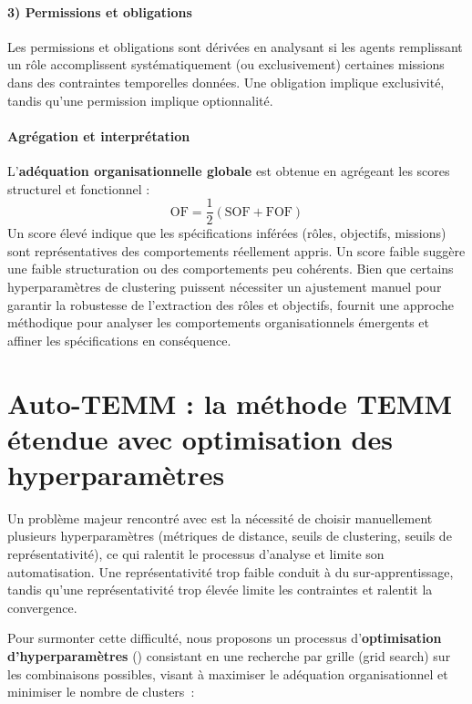 \paragraph{3) Permissions et obligations}
Les permissions et obligations sont dérivées en analysant si les agents remplissant un rôle accomplissent systématiquement (ou exclusivement) certaines missions dans des contraintes temporelles données.
Une obligation implique exclusivité, tandis qu’une permission implique optionnalité.

\paragraph{Agrégation et interprétation}
L’\textbf{adéquation organisationnelle globale} est obtenue en agrégeant les scores structurel et fonctionnel :
\[
  \text{OF} = \frac{1}{2} \left( \text{SOF} + \text{FOF} \right)
\]
Un score élevé indique que les spécifications inférées (rôles, objectifs, missions) sont représentatives des comportements réellement appris.
Un score faible suggère une faible structuration ou des comportements peu cohérents.
Bien que certains hyperparamètres de clustering puissent nécessiter un ajustement manuel pour garantir la robustesse de l’extraction des rôles et objectifs,  fournit une approche méthodique pour analyser les comportements organisationnels émergents et affiner les spécifications en conséquence.


\section{Auto-TEMM : la méthode TEMM étendue avec optimisation des hyperparamètres}

Un problème majeur rencontré avec  est la nécessité de choisir manuellement plusieurs hyperparamètres (métriques de distance, seuils de clustering, seuils de représentativité), ce qui ralentit le processus d'analyse et limite son automatisation. Une représentativité trop faible conduit à du sur-apprentissage, tandis qu'une représentativité trop élevée limite les contraintes et ralentit la convergence.


Pour surmonter cette difficulté, nous proposons un processus d'\textbf{optimisation d'hyperparamètres} () consistant en une recherche par grille (grid search) sur les combinaisons possibles, visant à maximiser le adéquation  organisationnel et minimiser le nombre de clusters~:

